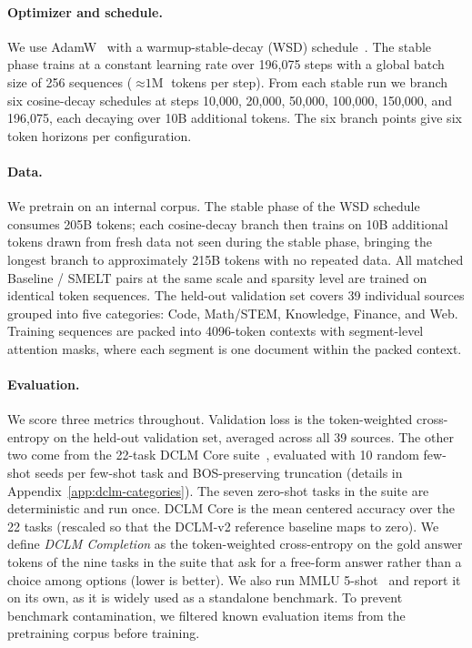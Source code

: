 \documentclass[]{bytedance_seed}
\newcommand{\archname}{SMELT}
\theoremstyle{definition}
\theoremstyle{remark}
\begin{document}
\paragraph{Optimizer and schedule.}
We use AdamW~\cite{loshchilov2019decoupled} with a warmup-stable-decay (WSD) schedule~\cite{hu2024minicpm}.
%
The stable phase trains at a constant learning rate over 196{,}075 steps with a global batch size of 256 sequences (${\approx}\text{1M}$ tokens per step).
%
From each stable run we branch six cosine-decay schedules at steps 10{,}000, 20{,}000, 50{,}000, 100{,}000, 150{,}000, and 196{,}075, each decaying over 10B additional tokens.
%
The six branch points give six token horizons per configuration.
%

\paragraph{Data.}
We pretrain on an internal corpus.
%
The stable phase of the WSD schedule consumes 205B tokens; each cosine-decay branch then trains on 10B additional tokens drawn from fresh data not seen during the stable phase, bringing the longest branch to approximately 215B tokens with no repeated data.
%
All matched Baseline / \archname{} pairs at the same scale and sparsity level are trained on identical token sequences.
%
The held-out validation set covers 39 individual sources grouped into five categories: Code, Math/STEM, Knowledge, Finance, and Web.
%
Training sequences are packed into 4096-token contexts with segment-level attention masks, where each segment is one document within the packed context.
%

\paragraph{Evaluation.}
We score three metrics throughout.
%
Validation loss is the token-weighted cross-entropy on the held-out validation set, averaged across all 39 sources.
%
The other two come from the 22-task DCLM Core suite~\cite{li2024datacomp}, evaluated with 10 random few-shot seeds per few-shot task and BOS-preserving truncation (details in Appendix~\ref{app:dclm-categories}).
%
The seven zero-shot tasks in the suite are deterministic and run once.
%
DCLM Core is the mean centered accuracy over the 22 tasks (rescaled so that the DCLM-v2 reference baseline maps to zero).
%
We define \textit{DCLM Completion} as the token-weighted cross-entropy on the gold answer tokens of the nine tasks in the suite that ask for a free-form answer rather than a choice among options (lower is better).
%
We also run MMLU 5-shot~\cite{hendrycks2021mmlu} and report it on its own, as it is widely used as a standalone benchmark.
%
To prevent benchmark contamination, we filtered known evaluation items from the pretraining corpus before training.
%
\end{document}
